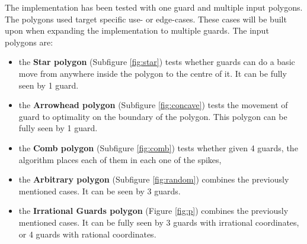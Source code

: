 The implementation has been tested with one guard and multiple input polygons. The polygons used target specific use- or edge-cases. These cases will be built upon when expanding the implementation to multiple guards. The input polygons are:


\begin{itemize}
    \item the \textbf{Star polygon} (Subfigure \ref{fig:star}) tests whether guards can do a basic move from anywhere inside the polygon to the centre of it. It can be fully seen by 1 guard.
    \item the \textbf{Arrowhead polygon} (Subfigure \ref{fig:concave}) tests the movement of guard to optimality on the boundary of the polygon. This polygon can be fully seen by 1 guard.
    \item the \textbf{Comb polygon} (Subfigure \ref{fig:comb}) tests whether given 4 guards, the algorithm places each of them in each one of the spikes,
    \item the \textbf{Arbitrary polygon} (Subfigure \ref{fig:random}) combines the previously mentioned cases. It can be seen by 3 guards.
    \item the \textbf{Irrational Guards polygon} (Figure \ref{fig:p}) combines the previously mentioned cases. It can be fully seen by 3 guards with irrational coordinates, or 4 guards with rational coordinates.
\end{itemize}

